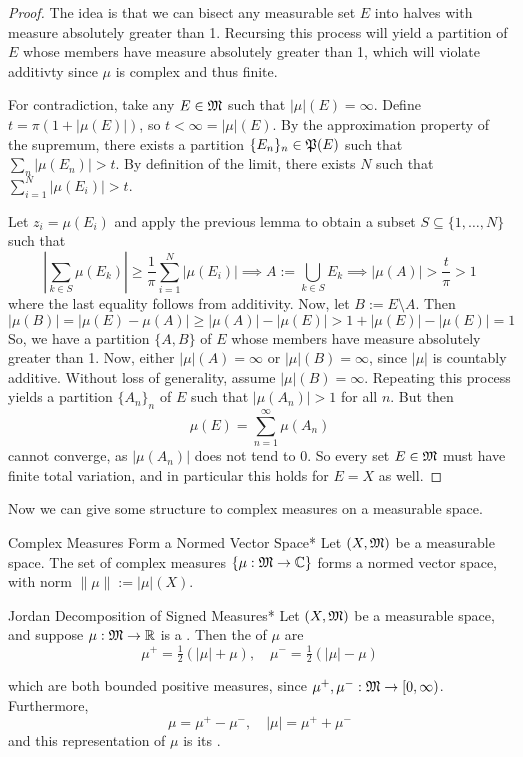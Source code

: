\begin{proof}
    The idea is that we can bisect any measurable set \(E\) into halves with measure absolutely greater than 1. Recursing this process will yield a partition of \(E\) whose members have measure absolutely greater than 1, which will violate additivty since \(\mu\) is complex and thus finite. 
    \stdvspace

    For contradiction, take any \(E \in \mathfrak{M}\) such that \(|\mu|(E) = \infty\). Define \(t = \pi(1 + |\mu(E)|)\), so \(t < \infty = |\mu|(E)\). By the approximation property of the supremum, there exists a partition \(\{E_n\}_n \in \mathfrak{P}(E)\) such that \(\sum_n |\mu(E_n)| > t\). By definition of the limit, there exists \(N\) such that \(\sum_{i=1}^N |\mu(E_i)| > t\).
    \stdvspace

    Let \(z_i = \mu(E_i)\) and apply the previous lemma to obtain a subset \(S \subseteq \{1, \dots, N\}\) such that
    \[
        \left| \sum_{k \in S} \mu(E_k) \right| \geq \frac{1}{\pi} \sum_{i=1}^N |\mu(E_i)|
        \implies A := \bigcup_{k \in S} E_k
        \implies |\mu(A)| > \frac{t}{\pi} > 1
    \]
    where the last equality follows from additivity. Now, let \(B := E \setminus A\). Then 
    \[
        |\mu(B)| = |\mu(E) - \mu(A)| 
        \geq |\mu(A)| - |\mu(E)|
        > 1 + |\mu(E)| - |\mu(E)|
        = 1
    \]
    So, we have a partition \(\{A, B\}\) of \(E\) whose members have measure absolutely greater than 1. Now, either \(|\mu|(A) = \infty\) or \(|\mu|(B) = \infty\), since \(|\mu|\) is countably additive. Without loss of generality, assume \(|\mu|(B) = \infty\). Repeating this process yields a partition \(\{A_n\}_n\) of \(E\) such that \(|\mu(A_n)| > 1\) for all \(n\). But then
    \[
        \mu(E) = \sum_{n=1}^\infty \mu(A_n)
    \]
    cannot converge, as \(|\mu(A_n)|\) does not tend to \(0\). So every set \(E \in \mathfrak{M}\) must have finite total variation, and in particular this holds for \(E = X\) as well.
\end{proof}

Now we can give some structure to complex measures on a measurable space. 

\begin{proposition}{Complex Measures Form a Normed Vector Space}*
    Let \((X, \mathfrak{M})\) be a measurable space. The set of complex measures \(\{\mu : \mathfrak{M} \to \mathbb{C}\}\) forms a normed vector space, with norm \(\|\mu\| := |\mu|(X)\). 
\end{proposition}

\begin{definition}{Jordan Decomposition of Signed Measures}*
    Let \((X, \mathfrak{M})\) be a measurable space, and suppose \(\mu : \mathfrak{M} \to \mathbb{R}\) is a . Then the  of \(\mu\) are 
    \[
        \mu^+ = \tfrac{1}{2}(|\mu| + \mu), 
        \quad 
        \mu^- = \tfrac{1}{2}(|\mu| - \mu)
    \]

    which are both bounded positive measures, since \(\mu^+, \mu^- : \mathfrak{M} \to [0, \infty)\). Furthermore, 
    \[
        \mu = \mu^+ - \mu^-, 
        \quad
        |\mu| = \mu^+ + \mu^-
    \]
    and this representation of \(\mu\) is its . 
\end{definition}

